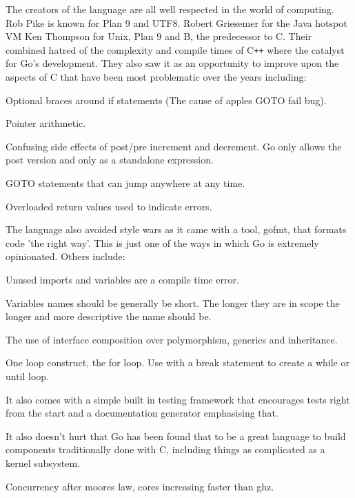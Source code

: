The creators of the language are all well respected in the world of computing.
Rob Pike is known for Plan 9 and UTF8. 
Robert Griesemer for the Java hotspot VM
Ken Thompson for Unix, Plan 9 and B, the predecessor to C.
Their combined hatred of the complexity and compile times of C\verb!++! where the catalyst for Go's development.
They also saw it as an opportunity to improve upon the aspects of C that have been most problematic over the years including:

\begin{itemize*}
	\item Optional braces around if statements (The cause of apples GOTO fail bug\cite{GOTOFAIL}).
	\item Pointer arithmetic.
	\item Confusing side effects of post/pre increment and decrement. Go only allows the post version and only as a standalone expression.
	\item GOTO statements that can jump anywhere at any time.
    \item Overloaded return values used to indicate errors.
\end{itemize*}

The language also avoided style wars as it came with a tool, gofmt, that formats code 'the right way'.
This is just one of the ways in which Go is extremely opinionated.
Others include:
\begin{itemize*}
	\item Unused imports and variables are a compile time error.
    \item Variables names should be generally be short. The longer they are in scope the longer and more descriptive the name should be.
    \item The use of interface composition over polymorphism, generics and inheritance.
    \item One loop construct, the for loop. Use with a break statement to create a while or until loop.
\end{itemize*}

It also comes with a simple built in testing framework that encourages tests right from the start and a documentation generator emphasising that.


It also doesn't hurt that Go has been found that to be a great language to build components traditionally done with C, including things as complicated as a kernel subsystem\cite{GONET}.

Concurrency after moores law, cores increasing faster than ghz.

